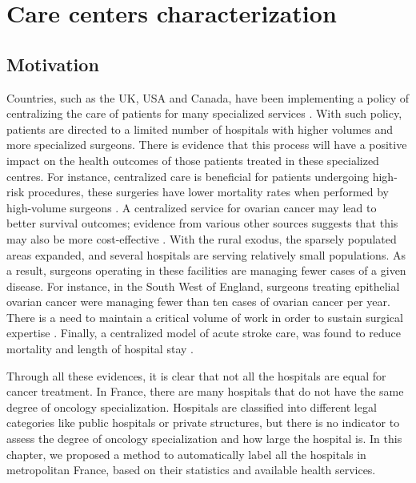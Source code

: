 \chapter{Care centers characterization}

\section{Motivation}

Countries, such as the UK, USA and Canada, have been implementing a policy of
centralizing the care of patients for many specialized services
\cite{kelly_are_2016}. With such policy, patients are directed to a limited
number of hospitals with higher volumes and more specialized surgeons. There is
evidence that this process will have a positive impact on the health outcomes of
those patients treated in these specialized centres. For instance, centralized
care is beneficial for patients undergoing high-risk procedures, these surgeries
have lower mortality rates when performed by high-volume surgeons
\cite{pekala_centralization_2021,birkmeyer_surgeon_2003,finks_trends_2011,
    hollenbeck_getting_2007,goossens-laan_systematic_2011}. A centralized service
for ovarian cancer may lead to better survival outcomes; evidence from various
other sources suggests that this may also be more cost-effective
\cite{woo_centralisation_2012}. With the rural exodus, the sparsely populated
areas expanded, and several hospitals are serving relatively small populations.
As a result, surgeons operating in these facilities are managing fewer cases of
a given disease. For instance, in the South West of England, surgeons treating
epithelial ovarian cancer were managing fewer than ten cases of ovarian cancer
per year. There is a need to maintain a critical volume of work in order to
sustain surgical expertise \cite{olaitan_surgical_2001}. Finally, a centralized
model of acute stroke care, was found to reduce mortality and length of hospital
stay \cite{morris_impact_2014}.

Through all these evidences, it is clear that not all the hospitals are equal
for cancer treatment. In France, there are many hospitals that do not have
the same degree of oncology specialization. Hospitals are classified into
different legal categories like public hospitals or private structures, but
there is no indicator to assess the degree of oncology specialization and
how large the hospital is. In this chapter, we proposed a method to automatically
label all the hospitals in metropolitan France, based on their statistics and
available health services.

